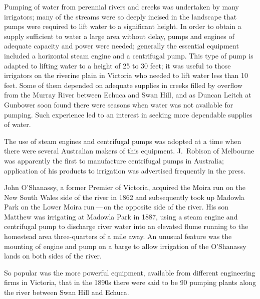 Pumping of water from perennial rivers and creeks was undertaken by
many irrigators; many of the streams were so deeply incised in the
landscape that pumps were required to lift water to a significant
height.  In order to obtain a supply sufficient to water a large area
without delay, pumps and engines of adequate capacity and power were
needed; generally the essential equipment included a horizontal steam
engine and a centrifugal pump. 
 This type of pump is adapted to lifting water
to a height of 25 to 30 feet; it was useful to those irrigators on the
riverine plain in Victoria who needed to lift water less than 10 feet.
Some of them depended on adequate supplies in creeks filled by
overflow from the Murray River
 between
Echuca  and Swan Hill,  and
as Duncan Leitch  at Gunbower soon found there were
seasons when water was not available for pumping.  Such experience led
to an interest in seeking more dependable supplies of water.

The use of steam engines and centrifugal pumps was adopted at a time
when there were several Australian makers of this equipment.
J.~Robison  of Melbourne was apparently the first
to manufacture centrifugal pumps in Australia; application of his
products to irrigation was advertised frequently in the
press.

John O'Shanassy,  a former Premier of Victoria,
acquired the Moira \index{Moira run, NSW} run on the New South Wales
side of the river in 1862 and subsequently took up Madowla Park
  on the Lower Moira
run\,---\,on the opposite si\-de of the river.  His son Matthew
 was irrigating at Madowla Park in 1887, using
a steam engine and centrifugal pump \index{pump!centrifugal} to
discharge river water into an elevated flume running to the homestead
area three-quarters of a mile away. An unusual feature was the
mounting of engine and pump on a barge to allow irrigation of the
O'Shanassy lands on both sides of the river.

So popular was the more powerful equipment, available from different
engineering firms in Victoria, that in the 1890s there were said to be
90 pumping plants along the river between Swan Hill and
Echuca.

